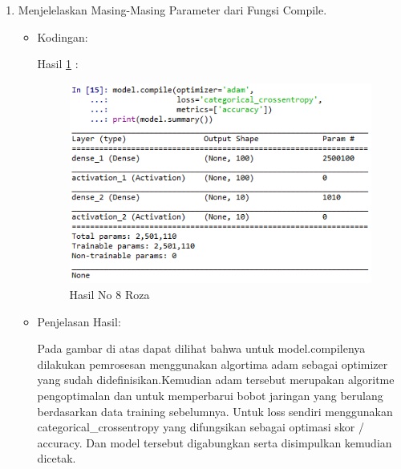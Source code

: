 \begin{enumerate}
\item Menjelelaskan Masing-Masing Parameter dari Fungsi Compile.
\begin{itemize}
\item Kodingan:

\par Hasil \ref{no8roza} :
\begin{figure}[!hbtp]
\centering
\includegraphics[scale=0.7]{figures/no8roza.png}
\caption{Hasil No 8 Roza}
\label{no8roza}
\end{figure}
\item Penjelasan Hasil:
\par Pada gambar di atas dapat dilihat bahwa untuk model.compilenya dilakukan pemrosesan menggunakan algortima adam sebagai optimizer yang sudah didefinisikan.Kemudian adam tersebut merupakan algoritme pengoptimalan dan untuk memperbarui bobot jaringan yang berulang berdasarkan data training sebelumnya. Untuk loss sendiri menggunakan categorical\_crossentropy yang difungsikan sebagai optimasi skor / accuracy. Dan model tersebut digabungkan serta disimpulkan kemudian dicetak.
\end{itemize}
\par


\end{enumerate}
